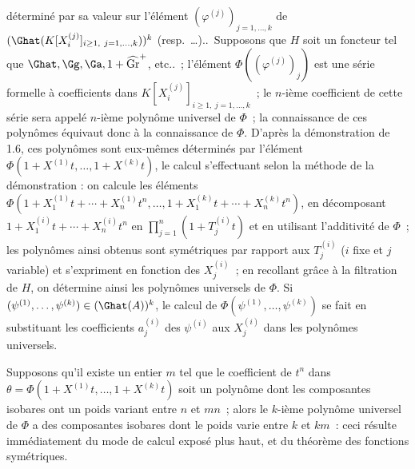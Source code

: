 déterminé par sa valeur sur l'élément \((\varphi^{(j)})_{j=1,\ldots,k}\) de \((\Ghat(K[X_i^{(j)}]_{i\geq1,\ j=1,\ldots,k}))^k\) (resp.\ \ldots)..\ Supposons que \(H\) soit un foncteur tel que \(\Ghat,\Gg,\Ga,1+\widehat{\operatorname{Gr}}^{+}\), etc..~; l'élément \(\Phi((\varphi^{(j)})_{j})\) est une série formelle à coefficients dans \(K[X_i^{(j)}]_{i\geq1,\ j=1,\ldots,k}\)~; le \(n\)-ième coefficient de cette série sera appelé \(n\)-ième polynôme universel de \(\Phi\)~; la connaissance de ces polynômes équivaut donc à la connaissance de \(\Phi\). D'après la démonstration de 1.6, ces polynômes sont eux-mêmes déterminés par l'élément \(\Phi(1+X^{(1)}t,\ldots,1+X^{(k)}t)\), le calcul s'effectuant selon la méthode de la démonstration : on calcule les éléments \(\Phi(1+X_1^{(1)}t+\cdots+X_n^{(1)}t^n,\ldots,1+X_1^{(k)}t+\cdots+X_n^{(k)}t^n)\), en décomposant \(1+X_1^{(i)}t+\cdots+X_n^{(i)}t^n\) en \(\prod_{j=1}^{n}(1+T_j^{(i)}t)\) et en utilisant l'additivité de \(\Phi\)~; les polynômes ainsi obtenus sont symétriques par rapport aux \(T_j^{(i)}\) (\(i\) fixe et \(j\) variable) et s'expriment en fonction des \(X_j^{(i)}\)~; en recollant grâce à la filtration de \(H\), on détermine ainsi les polynômes universels de \(\Phi\). Si \((\psi^{(1)},\ldots,\psi^{(k)})\in(\Ghat(A))^k\), le calcul de \(\Phi(\psi^{(1)},\ldots,\psi^{(k)})\) se fait en substituant les coefficients \(a_j^{(i)}\) des \(\psi^{(i)}\) aux \(X_j^{(i)}\) dans les polynômes universels.

Supposons qu'il existe un entier \(m\) tel que le coefficient de \(t^n\) dans \(\theta=\Phi(1+X^{(1)}t,\ldots,1+X^{(k)}t)\) soit un polynôme dont les composantes isobares ont un poids variant entre \(n\) et \(mn\)~; alors le \(k\)-ième polynôme universel de \(\Phi\) a des composantes isobares dont le poids varie entre \(k\) et \(km\)~: ceci résulte immédiatement du mode de calcul exposé plus haut, et du théorème des fonctions symétriques.

